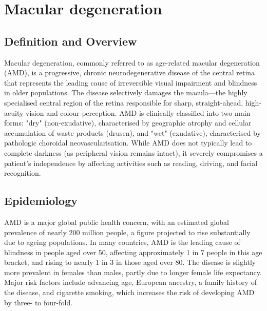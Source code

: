 \chapter{Macular degeneration}

\section*{Definition and Overview}
Macular degeneration, commonly referred to as age-related macular degeneration (AMD), is a progressive, chronic neurodegenerative disease of the central retina that represents the leading cause of irreversible visual impairment and blindness in older populations. The disease selectively damages the macula—the highly specialised central region of the retina responsible for sharp, straight-ahead, high-acuity vision and colour perception. AMD is clinically classified into two main forms: "dry" (non-exudative), characterised by geographic atrophy and cellular accumulation of waste products (drusen), and "wet" (exudative), characterised by pathologic choroidal neovascularisation. While AMD does not typically lead to complete darkness (as peripheral vision remains intact), it severely compromises a patient's independence by affecting activities such as reading, driving, and facial recognition.

\section*{Epidemiology}
AMD is a major global public health concern, with an estimated global prevalence of nearly 200 million people, a figure projected to rise substantially due to ageing populations. In many countries, AMD is the leading cause of blindness in people aged over 50, affecting approximately 1 in 7 people in this age bracket, and rising to nearly 1 in 3 in those aged over 80. The disease is slightly more prevalent in females than males, partly due to longer female life expectancy. Major risk factors include advancing age, European ancestry, a family history of the disease, and cigarette smoking, which increases the risk of developing AMD by three- to four-fold.

